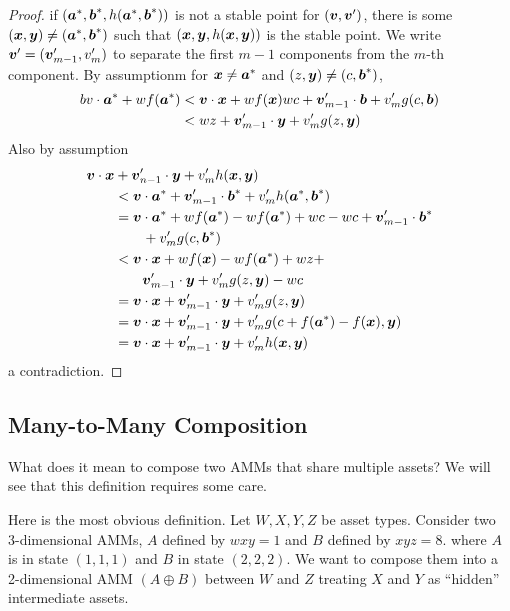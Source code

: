 \begin{proof}
if $(\ba^{*},\bb^{*},h(\ba^{*},\bb^{*}))$ is not a stable point for $(\bv,\bv')$,
there is some $(\bx,\by) \neq (\ba^{*},\bb^{*})$ such that
$(\bx,\by,h(\bx,\by))$ is the stable point.
We write $\bv' = (\bv'_{m-1},v'_m)$ to separate the first $m-1$ components from the $m$-th component.
By assumptionm for $\bx \neq \ba^{*}$ and $(z,\by) \neq (c,\bb^{*})$,
\begin{align*}
    bv \cdot \ba^{*} + wf(\ba^{*}) 
    &< \bv \cdot \bx + wf(\bx) wc + \bv'_{m-1} \cdot \bb +  v'_m g(c,\bb) \\
    &< wz + \bv'_{m-1} \cdot \by +  v'_m g(z,\by)
\end{align*}
Also by assumption
\begin{align*}
  \bv \cdot \bx& + \bv'_{n-1} \cdot \by + v'_{m}h(\bx,\by)\\
  &< \bv \cdot \ba^{*} + \bv'_{m-1} \cdot \bb^{*} + v'_{m}h(\ba^{*},\bb^{*}) \\
  &= \bv \cdot \ba^{*} +wf(\ba^{*}) - wf(\ba^{*}) + wc - wc +  \bv'_{m-1} \cdot \bb^{*} \\
  &\quad \quad + v'_{m}g(c,\bb^{*}) \\
    &< \bv \cdot \bx + wf(\bx) - wf(\ba^{*}) + wz +\\
    &\quad \quad\bv'_{m-1} \cdot \by + v'_mg(z,\by) - wc \\
    &= \bv \cdot \bx + \bv'_{m-1} \cdot \by + v'_mg(z,\by)\\ 
    &= \bv \cdot \bx + \bv'_{m-1} \cdot \by + v'_mg(c + f(\ba^{*}) - f(\bx),\by) \\
    &= \bv \cdot \bx + \bv'_{m-1} \cdot \by + v'_mh(\bx,\by)
\end{align*}
a contradiction.

\end{proof}

\subsection{Many-to-Many Composition}
What does it mean to compose two AMMs that share multiple assets?
We will see that this definition requires some care.

Here is the most obvious definition.
Let $W,X,Y,Z$ be asset types.
Consider two 3-dimensional AMMs, $A$ defined by $w x y = 1$ and 
$B$ defined by $x y z = 8$.
where $A$ is in state $(1,1,1)$ and $B$ in state $(2,2,2)$.
We want to compose them into a 2-dimensional AMM $(A \oplus B)$ between $W$ and $Z$
treating $X$ and $Y$ as ``hidden'' intermediate assets.

